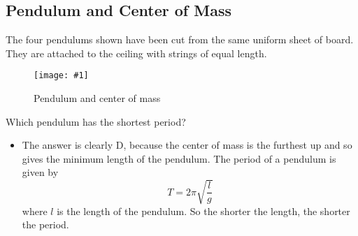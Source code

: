 \documentclass[a4paper,12pt]{article}
\newcommand{\img}[4]{\begin{center}
  \begin{figure}[H]
    \centering
    \texttt{[image: \#1]}
    \caption{#3}
    \label{fig:#4}
  \end{figure}
\end{center}}
\begin{document}
\subsection{Pendulum and Center of Mass}

The four pendulums shown have been cut from the same uniform sheet of board. They are attached to the ceiling with strings of equal length.

\img{ex/2.png}{0.5}{Pendulum and center of mass}{ex/2}

Which pendulum has the shortest period?

\begin{itemize}
  \item The answer is clearly D, because the center of mass is the furthest up and so gives the minimum length of the pendulum. The period of a pendulum is given by
        $$T = 2\pi\sqrt{\frac{l}{g}}$$
        where $l$ is the length of the pendulum. So the shorter the length, the shorter the period.
\end{itemize}
\end{document}
